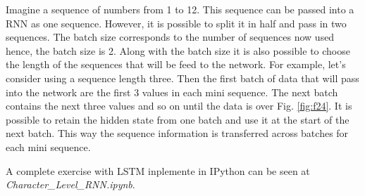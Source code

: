 \documentclass{article}
\begin{document}
Imagine a sequence of numbers from 1 to 12. This sequence can be passed into a RNN as one sequence. However, it is possible to split it in half and pass in two sequences. The batch size corresponds to the number of sequences now used hence, the batch size is 2. Along with the batch size it is also possible to choose the length of the sequences that will be feed to the network. For example, let's consider using a sequence length three. Then the first batch of data that will pass into the network are the first 3 values in each mini sequence. The next batch contains the next three values and so on until the data is over Fig. \ref{fig:f24}. It is possible to retain the hidden state from one batch and use it at the start of the next batch. This way the sequence information is transferred across batches for each mini sequence.

A complete exercise with LSTM inplemente in IPython can be seen at \textit{Character\_Level\_RNN.ipynb}.
\printbibliography
\end{document}
